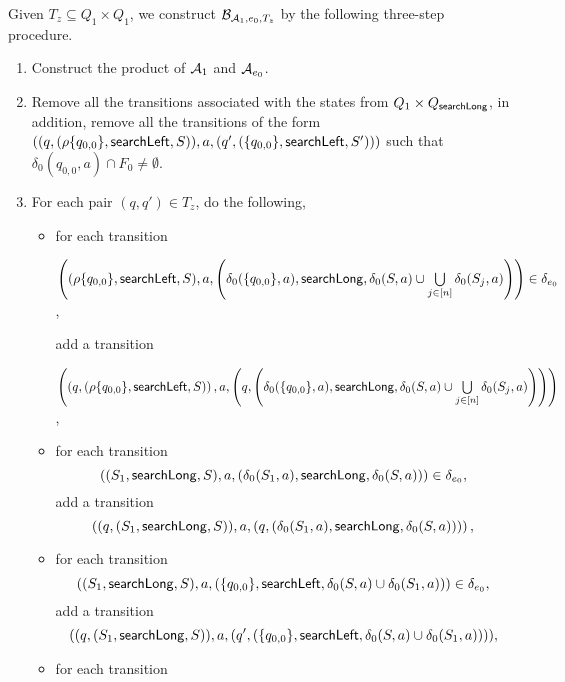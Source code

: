 

Given $T_z \subseteq Q_1 \times Q_1$, we construct $\mathcal{B}_{\mathcal{A}_1, e_0,  T_{z}}$ by  the following three-step procedure.
\begin{enumerate}
\item Construct the product of $\mathcal{A}_1$ and $\mathcal{A}_{e_0}$.

\item Remove all the transitions associated with the states from $Q_1 \times Q_{\mathsf{searchLong}}$, in addition, remove all the transitions of the form $((q, (\rho\{q_{0,0}\}, \mathsf{searchLeft}, S)), a, (q', (\{q_{0,0}\}, \mathsf{searchLeft},S')))$ such that $\delta_0(q_{0,0},a) \cap F_0 \neq \emptyset$.

\item For each pair $(q,q') \in T_{z}$, do the following,
\begin{itemize}
\item for each transition

\medskip

$\left((\rho \{q_{0,0}\}, \mathsf{searchLeft}, S), a, \left(\delta_0(\{q_{0,0}\}, a), \mathsf{searchLong}, \delta_0(S, a) \cup \bigcup \limits_{j \in [n]} \delta_0(S_j, a) \right) \right) \in \delta_{e_0}$,

\medskip

add a transition

\medskip

$\left( \left(q, (\rho \{q_{0,0}\}, \mathsf{searchLeft}, S) \right), a, \left(q, \left(\delta_0(\{q_{0,0}\}, a), \mathsf{searchLong}, \delta_0(S, a) \cup \bigcup \limits_{j \in [n]} \delta_0(S_j, a) \right) \right) \right)$,

\medskip

%
\item for each transition
		$$((S_1, \mathsf{searchLong}, S), a, (\delta_0(S_1,a), \mathsf{searchLong}, \delta_0(S,a))) \in \delta_{e_0},$$
add a transition
$$\left((q, (S_1, \mathsf{searchLong}, S)), a, (q, (\delta_0(S_1,a), \mathsf{searchLong}, \delta_0(S,a))) \right),$$
%
\item for each transition
		$$((S_1, \mathsf{searchLong}, S), a, (\{q_{0,0}\}, \mathsf{searchLeft}, \delta_0(S,a) \cup \delta_0(S_1,a))) \in \delta_{e_0},$$
add a transition
		$$((q, (S_1, \mathsf{searchLong}, S)), a, (q', (\{q_{0,0}\}, \mathsf{searchLeft}, \delta_0(S,a) \cup \delta_0(S_1,a)))),$$
%
\item for each transition


\end{itemize}
\end{enumerate}
